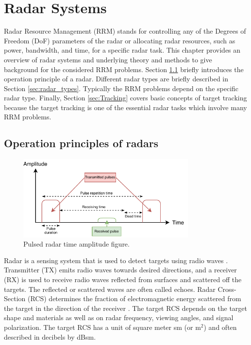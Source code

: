 \documentclass[english, 12pt, a4paper, elec, utf8, a-1b, online]{aaltothesis}
\begin{document}
\clearpage
\section{Radar Systems}\label{sec:background}

Radar Resource Management (RRM) stands for controlling any of the Degrees of Freedom (DoF) parameters of the radar or allocating radar resources, such as power, bandwidth, and time, for a specific radar task.
This chapter provides an overview of radar systems and underlying theory and methods to give background for the considered RRM problems.
Section \ref{sec:radar_opertaion_principle} briefly introduces the operation principle of a radar.
Different radar types are briefly described in Section \ref{sec:radar_types}. 
Typically the RRM problems depend on the specific radar type. 
Finally, Section \ref{sec:Tracking} covers basic concepts of target tracking because the target tracking is one of the essential radar tasks which involve many RRM problems.

\subsection{Operation principles of radars} \label{sec:radar_opertaion_principle}

\begin{figure}[htb]
    \centering
    \includegraphics[width=0.8\textwidth]{figures/background/pulsed_radar.pdf}
    \caption{Pulsed radar time amplitude figure.}
    \label{fig:pulsed_radar}
\end{figure}

Radar is a sensing system that is used to detect targets using radio waves \cite{Curry2011}.
Transmitter (TX) emits radio waves towards desired directions, and a receiver (RX) is used to receive radio waves reflected from surfaces and scattered off the targets. 
The reflected or scattered waves are often called echoes.
Radar Cross-Section (RCS) determines the fraction of electromagnetic energy scattered from the target in the direction of the receiver \cite{Curry2011}.
The target RCS depends on the target shape and materials as well as on radar frequency, viewing angles, and signal polarization.
The target RCS has a unit of square meter sm (or m$^2$) and often described in decibels by dBsm.
\end{document}
